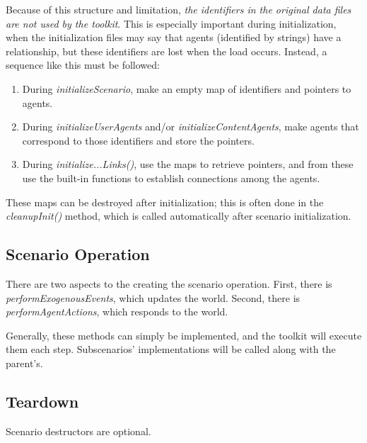 \par Because of this structure and limitation, \textit{the identifiers in the original data files are not used by the toolkit}. This is especially important during initialization, when the initialization files may say that agents (identified by strings) have a relationship, but these identifiers are lost when the load occurs. Instead, a sequence like this must be followed:
\begin{enumerate} 
	\item During \textit{initializeScenario}, make an empty map of identifiers and pointers to agents.
	\item During \textit{initializeUserAgents} and/or \textit{initializeContentAgents}, make agents that correspond to those identifiers and store the pointers.
	\item During \textit{initialize...Links()}, use the maps to retrieve pointers, and from these use the built-in \rhpc functions to establish connections among the agents.
\end{enumerate}

These maps can be destroyed after initialization; this is often done in the \textit{cleanupInit()} method, which is called automatically after scenario initialization.

\subsection{Scenario Operation}
There are two aspects to the creating the scenario operation. First, there is \textit{performExogenousEvents}, which updates the world. Second, there is \textit{performAgentActions}, which responds to the world. 

Generally, these methods can simply be implemented, and the toolkit will execute them each step. Subscenarios' implementations will be called along with the parent's.

\subsection{Teardown}
Scenario destructors are optional.

